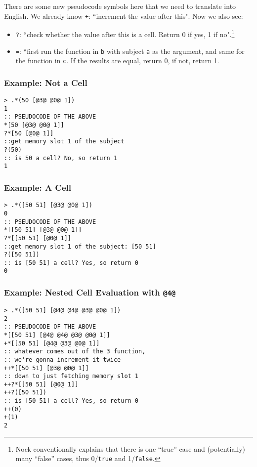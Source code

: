 \documentclass[twoside]{article}
\begin{document}
There are some new pseudocode symbols here that we need to translate into English. We already know \lstinline[style=inlinecode]{+}: ``increment the value after this". Now we also see:

\begin{itemize}
  \item  \lstinline[style=inlinecode]{?}: ``check whether the value after this is a cell. Return 0 if yes, 1 if no".\footnote{Nock conventionally explains that there is one ``true'' case and (potentially) many ``false'' cases, thus 0/\texttt{true} and 1/\texttt{false}.}
  \item  \lstinline[style=inlinecode]{=}: ``first run the function in \lstinline[style=inlinecode]{b} with subject \lstinline[style=inlinecode]{a} as the argument, and same for the function in \lstinline[style=inlinecode]{c}. If the results are equal, return 0, if not, return 1.
\end{itemize}


\subsubsection{Example:  Not a Cell}

\begin{lstlisting}[style=listingcode]
> .*(50 [@3@ @0@ 1])
1
:: PSEUDOCODE OF THE ABOVE
*[50 [@3@ @0@ 1]]
?*[50 [@0@ 1]]
::get memory slot 1 of the subject
?(50)
:: is 50 a cell? No, so return 1
1
\end{lstlisting}

\subsubsection{Example:  A Cell}

\begin{lstlisting}[style=listingcode]
> .*([50 51] [@3@ @0@ 1])
0
:: PSEUDOCODE OF THE ABOVE
*[[50 51] [@3@ @0@ 1]]
?*[[50 51] [@0@ 1]]
::get memory slot 1 of the subject: [50 51]
?([50 51])
:: is [50 51] a cell? Yes, so return 0
0
\end{lstlisting}

\subsubsection{Example:  Nested Cell Evaluation with \lstinline[style=inlinecode]{@4@}}

\begin{lstlisting}[style=listingcode]
> .*([50 51] [@4@ @4@ @3@ @0@ 1])
2
:: PSEUDOCODE OF THE ABOVE
*[[50 51] [@4@ @4@ @3@ @0@ 1]]
+*[[50 51] [@4@ @3@ @0@ 1]]
:: whatever comes out of the 3 function,
:: we're gonna increment it twice
++*[[50 51] [@3@ @0@ 1]]
:: down to just fetching memory slot 1
++?*[[50 51] [@0@ 1]]
++?([50 51])
:: is [50 51] a cell? Yes, so return 0
++(0)
+(1)
2
\end{lstlisting}
\end{document}
